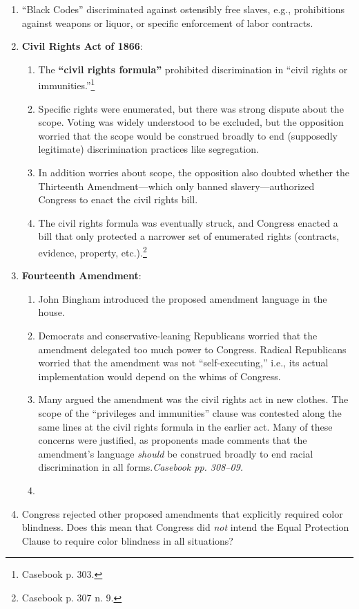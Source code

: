 \begin{enumerate}
    \item ``Black Codes'' discriminated against ostensibly free slaves, e.g., 
    prohibitions against weapons or liquor, or specific enforcement of labor 
    contracts.
    \item \textbf{Civil Rights Act of 1866}:
    \begin{enumerate}
        \item The \textbf{``civil rights formula''} prohibited discrimination 
        in ``civil rights or immunities.''\footnote{Casebook p. 303.}
        \item Specific rights were enumerated, but there was strong dispute 
        about the scope. Voting was widely understood to be excluded, but the 
        opposition worried that the scope would be construed broadly to end 
        (supposedly legitimate) discrimination practices like segregation.
        \item In addition worries about scope, the opposition also doubted 
        whether the Thirteenth Amendment---which only banned 
        slavery---authorized Congress to enact the civil rights bill.
        \item The civil rights formula was eventually struck, and Congress 
        enacted a bill that only protected a narrower set of enumerated rights 
        (contracts, evidence, property, etc.).\footnote{Casebook p. 307 n. 9.}
    \end{enumerate}
    \item \textbf{Fourteenth Amendment}:
    \begin{enumerate}
        \item John Bingham introduced the proposed amendment language in the 
        house.
        \item Democrats and conservative-leaning Republicans worried that the 
        amendment delegated too much power to Congress. Radical Republicans 
        worried that the amendment was not ``self-executing,'' i.e., its 
        actual implementation would depend on the whims of Congress.
        \item Many argued the amendment was the civil rights act in new 
        clothes. The scope of the ``privileges and immunities'' clause was 
        contested along the same lines at the civil rights formula in the 
        earlier act. Many of these concerns were justified, as proponents 
        made comments that the amendment's language \emph{should} be construed 
        broadly to end racial discrimination in all forms.\emph{Casebook pp. 
        308--09.}
        \item 
    \end{enumerate}
    \item Congress rejected other proposed amendments that explicitly required 
    color blindness. Does this mean that Congress did \emph{not} intend the 
    Equal Protection Clause to require color blindness in all situations?
\end{enumerate}

